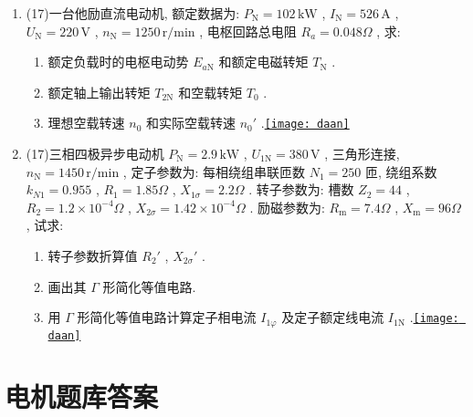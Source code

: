 \documentclass[lang=cn,11pt,marginpar=margintrue]{elegantbook}%
\newcommand{\daan}[1]{\hfill\hyperref[#1]{\texttt{[image: daan]}}}
\newcommand{\zt}[1]{\,\mathrm{#1}}
\newcommand{\NN}{\mathrm{N}}
\begin{document}
\begin{enumerate}
		\begin{enumerate}
			\item 此时该机是运行于发电机状态还是电动机状态?
			\item 电磁功率与电磁转矩为多少?
			\item 输入功率与效率为多少?\daan{js:29}
		\end{enumerate}
	\item (17)一台他励直流电动机, 额定数据为: $P_{\NN}=102\zt{kW}$ , $I_{\NN}=526\zt{A}$ , $U_{\NN}=220\zt{V}$ , $n_{\NN}=1250\zt{r/min}$ , 电枢回路总电阻 $R_a=0.048\Omega$ , 求:
		\begin{enumerate}
			\item 额定负载时的电枢电动势 $E_{a\NN}$ 和额定电磁转矩 $T_{\NN}$ .
			\item 额定轴上输出转矩 $T_{2\NN}$ 和空载转矩 $T_0$ .
			\item 理想空载转速 $n_0$ 和实际空载转速 $n_0'$ .\daan{js:30}
		\end{enumerate}
	\item (17)三相四极异步电动机 $P_{\NN}=2.9\zt{kW}$ , $U_{1\NN}=380\zt{V}$ , 三角形连接, $n_{\NN}=1450\zt{r/min}$ , 定子参数为: 每相绕组串联匝数 $N_1=250$ 匝, 绕组系数 $k_{N1}=0.955$ , $R_1=1.85\Omega$ , $X_{1\sigma}=2.2\Omega$ . 转子参数为: 槽数 $Z_2=44$ , $R_2=1.2\times 10^{-4}\Omega$ , $X_{2\sigma}=1.42\times 10^{-4}\Omega$ . 励磁参数为: $R_{\mathrm{m}}=7.4\Omega$ , $X_{\mathrm{m}}=96\Omega$ , 试求:
		\begin{enumerate}
			\item 转子参数折算值 $R_2'$ , $X_{2\sigma}'$ .
			\item 画出其 $\Gamma$ 形简化等值电路.
			\item 用 $\Gamma$ 形简化等值电路计算定子相电流 $I_{1\varphi}$ 及定子额定线电流 $I_{1\NN}$ .\daan{js:31}
		\end{enumerate}
\end{enumerate}





\chapter{电机题库答案}
\end{document}
